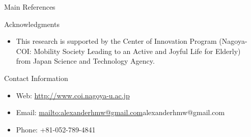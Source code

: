 \documentclass[final,hyperref={pdfpagelabels=false}]{beamer}
\begin{document}
\begin{frame}[t]
\begin{columns}[t]
\begin{column}{.48\textwidth}
\begin{block}{Main References}
        
\nocite{*} %
\small{
}

\end{block}


\begin{block}{Acknowledgments}

\begin{itemize}
\item This research is supported by the Center of Innovation Program (Nagoya-COI: Mobility Society Leading to an Active and Joyful Life for Elderly) from Japan Science and Technology Agency.
\end{itemize}

\end{block}



\begin{block}{Contact Information}

\begin{itemize}
\item Web: \url{http://www.coi.nagoya-u.ac.jp}
\item Email: \url{mailto:alexanderhmw@gmail.com}{alexanderhmw@gmail.com}
\item Phone: +81-052-789-4841
\end{itemize}

\end{block}


\end{column} %

\begin{column}{.015\textwidth}\end{column} %

\end{columns} %

\end{frame} %
\end{document}
